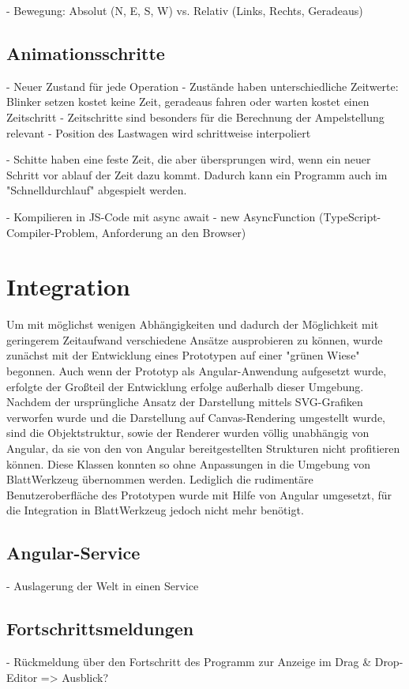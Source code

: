 - Bewegung: Absolut (N, E, S, W) vs. Relativ (Links, Rechts, Geradeaus)

\subsection{Animationsschritte}

- Neuer Zustand für jede Operation
- Zustände haben unterschiedliche Zeitwerte: Blinker setzen kostet keine Zeit,
  geradeaus fahren oder warten kostet einen Zeitschritt
- Zeitschritte sind besonders für die Berechnung der Ampelstellung relevant
- Position des Lastwagen wird schrittweise interpoliert

- Schitte haben eine feste Zeit, die aber übersprungen wird, wenn ein neuer
  Schritt vor ablauf der Zeit dazu kommt. Dadurch kann ein Programm auch im
  "Schnelldurchlauf" abgespielt werden.

- Kompilieren in JS-Code mit async await
- new AsyncFunction (TypeScript-Compiler-Problem, Anforderung an den Browser)

\section{Integration}

Um mit möglichst wenigen Abhängigkeiten und dadurch der Möglichkeit mit geringerem Zeitaufwand verschiedene Ansätze ausprobieren zu können, wurde zunächst mit der Entwicklung eines Prototypen auf einer "grünen Wiese" begonnen. Auch wenn der Prototyp als Angular-Anwendung aufgesetzt wurde, erfolgte der Großteil der Entwicklung erfolge außerhalb dieser Umgebung. Nachdem der ursprüngliche Ansatz der Darstellung mittels SVG-Grafiken verworfen wurde und die Darstellung auf Canvas-Rendering umgestellt wurde, sind die Objektstruktur, sowie der Renderer wurden völlig unabhängig von Angular, da sie von den von Angular bereitgestellten Strukturen nicht profitieren können. Diese Klassen konnten so ohne Anpassungen in die Umgebung von BlattWerkzeug übernommen werden. Lediglich die rudimentäre Benutzeroberfläche des Prototypen  wurde mit Hilfe von Angular umgesetzt, für die Integration in BlattWerkzeug jedoch nicht mehr benötigt.

\subsection{Angular-Service}

- Auslagerung der Welt in einen Service

\subsection{Fortschrittsmeldungen}

- Rückmeldung über den Fortschritt des Programm zur Anzeige im Drag \& Drop-Editor => Ausblick?
